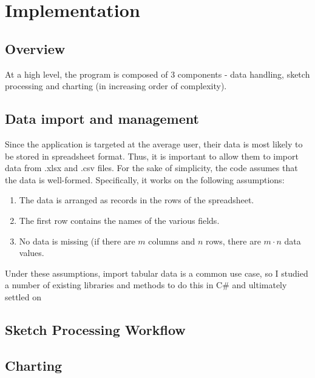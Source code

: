 \chapter{Implementation}
	\section{Overview}
		At a high level, the program is composed of 3 components - data handling, sketch processing and charting (in increasing order of complexity).
	\section{Data import and management}
		Since the application is targeted at the average user, their data is most likely to be stored in spreadsheet format. Thus, it is important to allow them to import data from .xlsx and .csv files. 
		For the sake of simplicity, the code assumes that the data is well-formed. Specifically, it works on the following assumptions:
		\begin{enumerate}
		\item The data is arranged as records in the rows of the spreadsheet.
		\item The first row contains the names of the various fields.
		\item No data is missing (if there are $m$ columns and $n$ rows, there are $m \cdot n$ data values.
		\end{enumerate}
		
		Under these assumptions, import tabular data is a common use case, so I studied a number of existing libraries and methods to do this in C\# and ultimately settled on 
	\section{Sketch Processing Workflow}
	\section{Charting}
	
